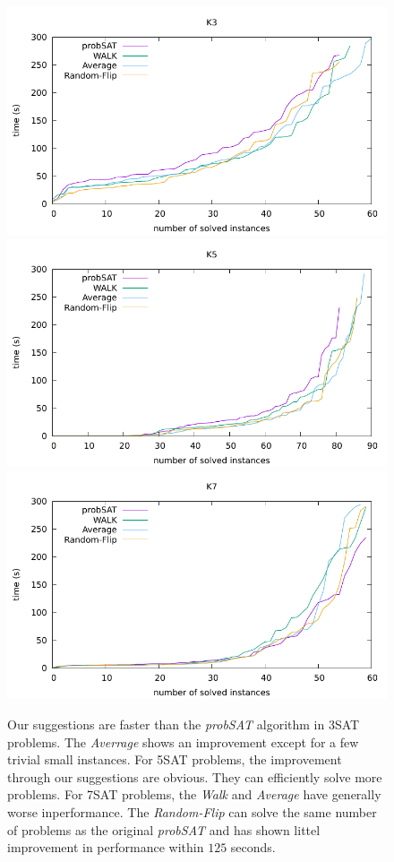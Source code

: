 \documentclass[12pt,a4paper,twoside]{scrartcl}
\numberwithin{equation}{section}
\begin{document}
\begin{figure}[H]
\begin{center}
  \includegraphics[scale = 0.8]{DATA/K3/e2.pdf}
    \includegraphics[scale = 0.8]{DATA/K5/e2.pdf}
      \includegraphics[scale = 0.8]{DATA/K7/e2.pdf}

  \end{center}
  \caption{Our suggestions are faster than the \emph{probSAT} algorithm in 3SAT problems. The \emph{Averrage} shows an improvement except for a few trivial small instances. For 5SAT problems, the improvement through our suggestions are obvious. They can efficiently solve more problems. For 7SAT problems, the \emph{Walk} and \emph{Average} have generally worse inperformance. The \emph{Random-Flip} can solve the same number of problems as the original \emph{probSAT} and has shown littel improvement in performance within $125$ seconds.}

  \label{Experiment 2 cactus plot}
  \end{figure}
\clearpage
\end{document}
